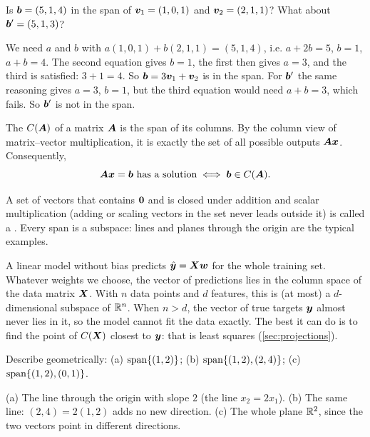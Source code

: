 \begin{example}\label{ex:in-span}
Is $\bm{b} = (5, 1, 4)$ in the span of $\bm{v}_1 = (1, 0, 1)$ and $\bm{v}_2 = (2, 1, 1)$?
What about $\bm{b}' = (5, 1, 3)$?

\sol We need $a$ and $b$ with $a(1,0,1) + b(2,1,1) = (5,1,4)$, i.e.
$a + 2b = 5$, $b = 1$, $a + b = 4$. The second equation gives $b = 1$, the first
then gives $a = 3$, and the third is satisfied: $3 + 1 = 4$. So
$\bm{b} = 3\bm{v}_1 + \bm{v}_2$ is in the span. For $\bm{b}'$ the same reasoning gives
$a = 3$, $b = 1$, but the third equation would need $a + b = 3$, which fails.
So $\bm{b}'$ is not in the span.
\end{example}

\begin{definition}\label{def:column-space}
The  $C(\bm{A})$ of a matrix $\bm{A}$ is the span of its columns.
By the column view of matrix--vector multiplication, it is exactly the set of
all possible outputs $\bm{A}\bm{x}$. Consequently,
\[
  \bm{A}\bm{x} = \bm{b} \text{ has a solution} \iff \bm{b} \in C(\bm{A}).
\]
\end{definition}

A set of vectors that contains $\bm{0}$ and is closed under addition and
scalar multiplication (adding or scaling vectors in the set never leads
outside it) is called a . Every span is a subspace: lines and
planes through the origin are the typical examples.

\begin{mlnote}
A linear model without bias predicts $\hat{\bm{y}} = \bm{X}\bm{w}$ for the whole training
set. Whatever weights we choose, the vector of predictions lies in the column
space of the data matrix $\bm{X}$. With $n$ data points and $d$ features, this is
(at most) a $d$-dimensional subspace of $\mathbb{R}^n$. When $n > d$, the vector of true
targets $\bm{y}$ almost never lies in it, so the model cannot fit the data
exactly. The best it can do is to find the point of $C(\bm{X})$ closest to $\bm{y}$:
that is least squares (\cref{sec:projections}).
\end{mlnote}

\sectionexercises

\begin{exercise}
Describe geometrically: (a) $\operatorname{span}\{(1, 2)\}$; (b) $\operatorname{span}\{(1, 2), (2, 4)\}$;
(c) $\operatorname{span}\{(1, 2), (0, 1)\}$.
\end{exercise}
\begin{solution}
(a) The line through the origin with slope $2$ (the line $x_2 = 2x_1$).
(b) The same line: $(2,4) = 2(1,2)$ adds no new direction. (c) The whole plane
$\mathbb{R}^2$, since the two vectors point in different directions.
\end{solution}

